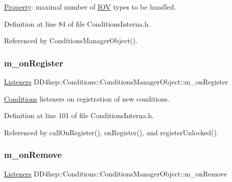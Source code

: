 \hyperlink{class_d_d4hep_1_1_property}{Property}\+: maximal number of \hyperlink{class_d_d4hep_1_1_i_o_v}{I\+OV} types to be handled. 



Definition at line 84 of file Conditions\+Interna.\+h.



Referenced by Conditions\+Manager\+Object().

\hypertarget{class_d_d4hep_1_1_conditions_1_1_conditions_manager_object_a28a1e3f34a87dcd305b0f71bb92f297f}{}\label{class_d_d4hep_1_1_conditions_1_1_conditions_manager_object_a28a1e3f34a87dcd305b0f71bb92f297f} 
\subsubsection{\texorpdfstring{m\+\_\+on\+Register}{m\_onRegister}}
{\footnotesize\ttfamily \hyperlink{class_d_d4hep_1_1_conditions_1_1_conditions_manager_object_aba0162524bc90a39e30bd5f1f0067ee2}{Listeners} D\+D4hep\+::\+Conditions\+::\+Conditions\+Manager\+Object\+::m\+\_\+on\+Register}



\hyperlink{namespace_d_d4hep_1_1_conditions}{Conditions} listeners on registration of new conditions. 



Definition at line 101 of file Conditions\+Interna.\+h.



Referenced by call\+On\+Register(), on\+Register(), and register\+Unlocked().

\hypertarget{class_d_d4hep_1_1_conditions_1_1_conditions_manager_object_aa6081a3511680ee1060e78b6a570636d}{}\label{class_d_d4hep_1_1_conditions_1_1_conditions_manager_object_aa6081a3511680ee1060e78b6a570636d} 
\subsubsection{\texorpdfstring{m\+\_\+on\+Remove}{m\_onRemove}}
{\footnotesize\ttfamily \hyperlink{class_d_d4hep_1_1_conditions_1_1_conditions_manager_object_aba0162524bc90a39e30bd5f1f0067ee2}{Listeners} D\+D4hep\+::\+Conditions\+::\+Conditions\+Manager\+Object\+::m\+\_\+on\+Remove}



